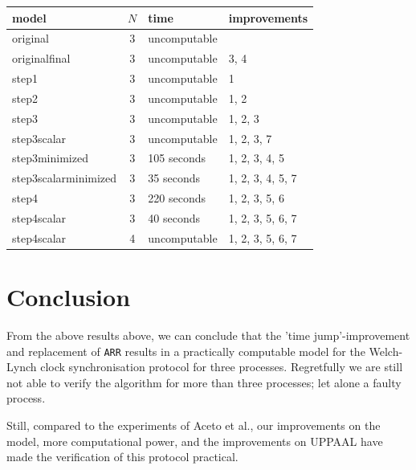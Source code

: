 \documentclass[a4paper,10pt]{article}
\begin{document}
\vspace{1 em}

\begin{tabular}{|l|c|l|l|}
\hline
\textbf{model} & \textbf{$N$} & \textbf{time} & \textbf{improvements} \\ \hline
original & 3 & uncomputable & \\ \hline
originalfinal & 3 & uncomputable & 3, 4 \\ \hline
step1 & 3 & uncomputable & 1 \\ \hline
step2 & 3 & uncomputable & 1, 2 \\ \hline
step3 & 3 & uncomputable & 1, 2, 3 \\ \hline
step3scalar & 3 & uncomputable & 1, 2, 3, 7 \\ \hline
step3minimized & 3 & 105 seconds & 1, 2, 3, 4, 5 \\ \hline
step3scalarminimized & 3 & 35 seconds & 1, 2, 3, 4, 5, 7 \\ \hline
step4 & 3 & 220 seconds & 1, 2, 3, 5, 6\\ \hline
step4scalar & 3 & 40 seconds & 1, 2, 3, 5, 6, 7 \\ \hline
step4scalar & 4 & uncomputable & 1, 2, 3, 5, 6, 7 \\ \hline
\end{tabular}


\section{Conclusion}
	

From the above results above, we can conclude that the 'time jump'-improvement and replacement of \texttt{ARR} results in a practically computable model for the Welch-Lynch clock synchronisation protocol for three processes. Regretfully we are still not able to verify the algorithm for more than three processes; let alone a faulty process.

Still, compared to the experiments of Aceto et al., our improvements on the model, more computational power, and the improvements on UPPAAL have made the verification of this protocol practical.



\end{document}
